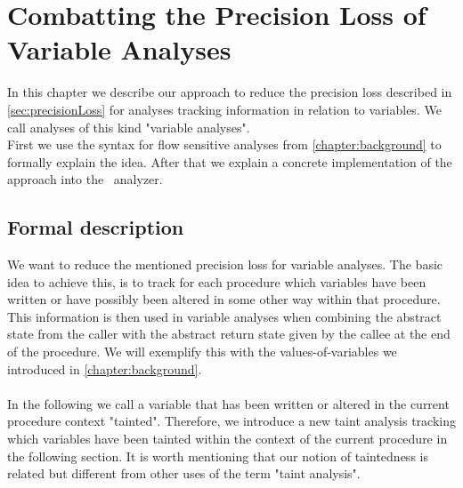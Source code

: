 

\chapter{Combatting the Precision Loss of Variable Analyses}\label{chapter:precisionLossVariableAnalyses}
  In this chapter we describe our approach to reduce the precision loss described in \autoref{sec:precisionLoss} for analyses tracking information in relation to variables. We call analyses of this kind "variable analyses".\\
  First we use the syntax for flow sensitive analyses from \autoref{chapter:background} to formally explain the idea. After that we explain a concrete implementation of the approach into the \gob\ analyzer.
  \section{Formal description}
  We want to reduce the mentioned precision loss for variable analyses. The basic idea to achieve this, is to track for each procedure which variables have been written or have possibly been altered in some other way within that procedure. This information is then used in variable analyses when combining the abstract state from the caller with the abstract return state given by the callee at the end of the procedure. We will exemplify this with the values-of-variables we introduced in \autoref{chapter:background}.\\
  \\
  In the following we call a variable that has been written or altered in the current procedure context "tainted". Therefore, we introduce a new taint analysis tracking which variables have been tainted within the context of the current procedure in the following section. It is worth mentioning that our notion of taintedness is related but different from other uses of the term "taint analysis".\\
